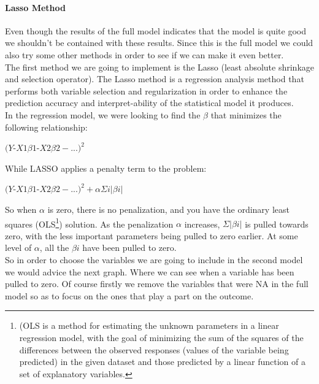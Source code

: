 \documentclass{article}
\begin{document}
\paragraph{Lasso Method}
Even though the results of the full model indicates that the model is quite good we shouldn't be contained with these results. Since this is the full model we could also try some other methods in order to see if we can make it even better.\\
The first method we are going to implement is the Lasso (least absolute shrinkage and selection operator). The Lasso method is a regression analysis method that performs both variable selection and regularization in order to enhance the prediction accuracy and interpret-ability of the statistical model it produces.\\
In the regression model, we were looking to find the $β$ that minimizes the following relationship:
\begin{center}
$(Y${-}$X1\beta 1${-}$X2\beta 2−...)^{2}$
\end{center}
While LASSO applies a penalty term to the problem:
\begin{center}
$(Y${-}$X1\beta 1${-}$X2\beta 2−...)^{2}+\alpha\Sigma i|\beta i|$
\end{center}
So when $\alpha$ is zero, there is no penalization, and you have the ordinary least squares (OLS\footnote{(OLS is a method for estimating the unknown parameters in a linear regression model, with the goal of minimizing the sum of the squares of the differences between the observed responses (values of the variable being predicted) in the given dataset and those predicted by a linear function of a set of explanatory variables.}) solution. As the penalization $\alpha$ increases, $\Sigma|\beta i|$ is pulled towards zero, with the less important parameters being pulled to zero earlier. At some level of $\alpha$, all the $βi$ have been pulled to zero.\\
So in order to choose the variables we are going to include in the second model we would advice the next graph. Where we can see when a variable has been pulled to zero. Of course firstly we remove the variables that were NA in the full model so as to focus on the ones that play a part on the outcome. 
\end{document}
